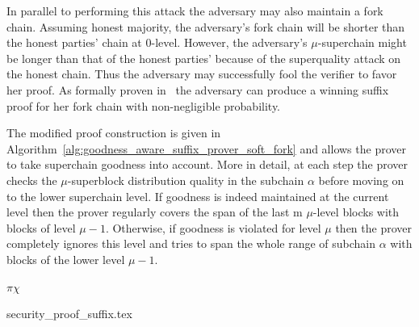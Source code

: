 In parallel to performing this attack the adversary may also maintain a fork chain. Assuming honest majority, the adversary's fork chain will be shorter than the honest parties' chain at 0-level. However, the adversary's $\mu$-superchain might be longer than that of the honest parties' because of the superquality attack on the honest chain. Thus the adversary may successfully fool the verifier to favor her proof. As formally proven in~\cite{nipopows} the adversary can produce a winning suffix proof for her fork chain with non-negligible probability.

The modified proof construction is given in Algorithm~\ref{alg:goodness_aware_suffix_prover_soft_fork} and allows the prover to take superchain goodness into account. More in detail, at each step the prover checks the $\mu$-superblock distribution quality in the subchain $\alpha$ before moving on to the lower superchain level. If goodness is indeed maintained at the current level then the prover regularly covers the span of the last m $\mu$-level blocks with blocks of level $\mu-1$. Otherwise, if goodness is violated for level $\mu$ then the prover completely ignores this level and tries to span the whole range of subchain $\alpha$ with blocks of the lower level $\mu - 1$.

\begin{algorithm}[h]
		\caption{\label{alg:goodness_aware_suffix_prover_soft_fork}The \textit{goodness aware} Suffix Prover for the superblock NIPoPoW protocol~\cite{nipopows}}
		\begin{algorithmic}[1]
                        \Let{\pi}{\pi \cup \alpha}
                        \EndIf
					\EndFor
					\Let{\chi}{\chain[-k{:}]}
					\State\Return$\pi\chi$
				\EndFunction
		\end{algorithmic}
\end{algorithm}

{security_proof_suffix.tex} 